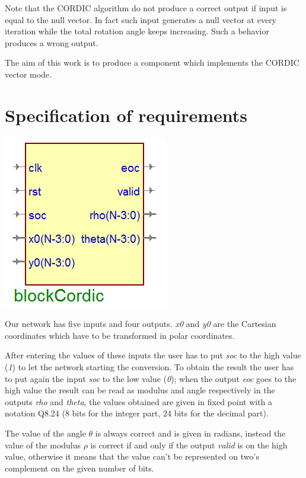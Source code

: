 \documentclass[12pt,a4paper]{report}
\begin{document}
Note that the CORDIC algorithm do not produce a correct output if input is equal to the null vector. In fact such input generates a null vector at every iteration while the total rotation angle keeps increasing. Such a behavior produces a wrong output.

The aim of this work is to produce a component which implements the CORDIC vector mode.

\section{Specification of requirements}

\begin{center}
\includegraphics[scale=.50]{img/cd.jpg}\\
\end{center}

Our network has five inputs and four outputs. \emph{x0} and \emph{y0} are the Cartesian coordinates which have to be transformed in polar coordinates. 

After entering the values of these inputs the user has to put \emph{soc} to the high value (\emph{1}) to let the network starting the conversion. To obtain the result the user has to put again the input \emph{soc} to the low value (\emph{0}); when the output \emph{eoc} goes to the high value the result can be read as modulus and angle respectively in the outputs \emph{rho} and \emph{theta}, the values obtained are given in fixed point with a notation Q8.24 (8 bits for the integer part, 24 bits for the decimal part). 

The value of the angle $\theta$ is always correct and is given in radians, instead the value of the modulus $\rho$ is correct if and  only if the output \emph{valid} is on the high value, otherwise it means that the value can't be represented on two's complement on the given number of bits. 
\end{document}
